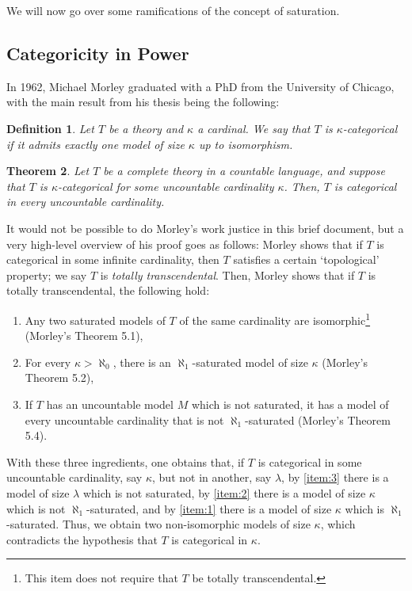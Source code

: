 \documentclass{article}
\newtheorem{theorem}{Theorem}[section]
\newtheorem{definition}[theorem]{Definition}
\theoremstyle{nonumberplain}
\begin{document}
We will now go over some ramifications of the concept of saturation.

\subsection{Categoricity in Power}\label{sec:morley}

In 1962, Michael Morley graduated with a PhD from the University of Chicago, with the main result from his thesis \cite{morley} being the following:

\begin{definition}
Let $T$ be a theory and $\kappa$ a cardinal. We say that $T$ is \emph{$\kappa$-categorical} if it admits \emph{exactly} one model of size $\kappa$ up to isomorphism.
\end{definition}

\begin{theorem}\label{thm:morley}
Let $T$ be a complete theory in a countable language, and suppose that $T$ is $\kappa$-categorical for some uncountable cardinality $\kappa$. Then, $T$ is categorical in every uncountable cardinality.
\end{theorem}

It would not be possible to do Morley's work justice in this brief document, but a very high-level overview of his proof goes as follows: Morley shows that if $T$ is categorical in some infinite cardinality, then $T$ satisfies a certain `topological' property; we say $T$ is \emph{totally transcendental}. Then, Morley shows that if $T$ is totally transcendental, the following hold:
\begin{enumerate}
\item\label{item:3} Any two saturated models of $T$ of the same cardinality are isomorphic\footnote{This item does not require that $T$ be totally transcendental.} (Morley's Theorem 5.1),
\item\label{item:1} For every $\kappa > \aleph_0$, there is an $\aleph_1$-saturated model of size $\kappa$ (Morley's Theorem 5.2),
\item	\label{item:2} If $T$ has an uncountable model $M$ which is not saturated, it has a model of every uncountable cardinality that is not $\aleph_1$-saturated (Morley's Theorem 5.4).
\end{enumerate}

With these three ingredients, one obtains that, if $T$ is categorical in some uncountable cardinality, say $\kappa$, but not in another, say $\lambda$, by \ref{item:3} there is a model of size $\lambda$ which is not saturated, by \ref{item:2} there is a model of size $\kappa$ which is not $\aleph_1$-saturated, and by \ref{item:1} there is a model of size $\kappa$ which is $\aleph_1$-saturated. Thus, we obtain two non-isomorphic models of size $\kappa$, which contradicts the hypothesis that $T$ is categorical in $\kappa$.
\end{document}
